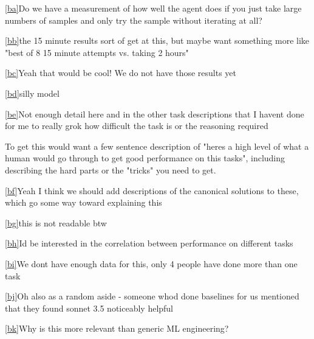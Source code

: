 \documentclass[
]{article}
\begin{document}
\label{cmnt53}\hyperref[cmnt_ref53]{{[}ba{]}}{Do we have
a measurement of how well the agent does if you just take large numbers
of samples and only try the sample without iterating at all?}

\label{cmnt54}\hyperref[cmnt_ref54]{{[}bb{]}}{the 15
minute results sort of get at this, but maybe want something more like
"best of 8 15 minute attempts vs. taking 2 hours"}

\label{cmnt55}\hyperref[cmnt_ref55]{{[}bc{]}}{Yeah that
would be cool! We do not have those results yet}

\label{cmnt56}\hyperref[cmnt_ref56]{{[}bd{]}}{silly
model}

\label{cmnt57}\hyperref[cmnt_ref57]{{[}be{]}}{Not enough
detail here and in the other task descriptions that I
haven\textquotesingle t done for me to really grok how difficult the
task is or the reasoning required}

{}

{To get this would want a few sentence description of
"here\textquotesingle s a high level of what a human would go through to
get good performance on this tasks", including describing the hard parts
or the "tricks" you need to get.}

\label{cmnt58}\hyperref[cmnt_ref58]{{[}bf{]}}{Yeah I
think we should add descriptions of the canonical solutions to these,
which go some way toward explaining this}

\label{cmnt59}\hyperref[cmnt_ref59]{{[}bg{]}}{this is not
readable btw}

\label{cmnt60}\hyperref[cmnt_ref60]{{[}bh{]}}{I\textquotesingle d
be interested in the correlation between performance on different tasks}

\label{cmnt61}\hyperref[cmnt_ref61]{{[}bi{]}}{We
don\textquotesingle t have enough data for this, only 4 people have done
more than one task}

\label{cmnt62}\hyperref[cmnt_ref62]{{[}bj{]}}{Oh also as
a random aside - someone who\textquotesingle d done baselines for us
mentioned that they found sonnet 3.5 noticeably helpful}

\label{cmnt63}\hyperref[cmnt_ref63]{{[}bk{]}}{Why is this
more relevant than generic ML engineering?}
\end{document}
